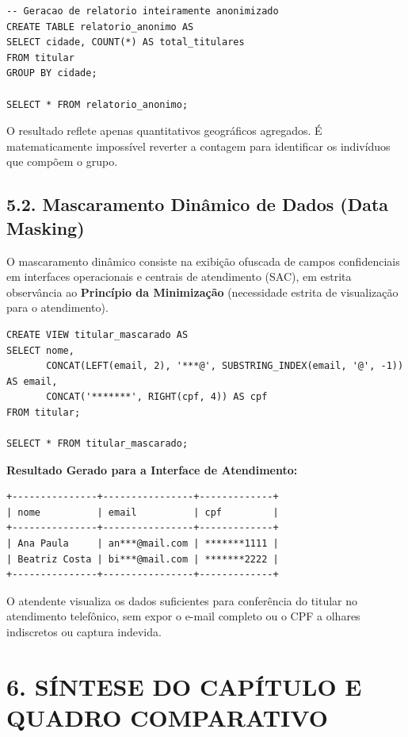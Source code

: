 \begin{lstlisting}
-- Geracao de relatorio inteiramente anonimizado
CREATE TABLE relatorio_anonimo AS
SELECT cidade, COUNT(*) AS total_titulares
FROM titular
GROUP BY cidade;

SELECT * FROM relatorio_anonimo;
\end{lstlisting}
O resultado reflete apenas quantitativos geográficos agregados. É matematicamente impossível reverter a contagem para identificar os indivíduos que compõem o grupo.

\subsection*{5.2. Mascaramento Dinâmico de Dados (Data Masking)}

O mascaramento dinâmico consiste na exibição ofuscada de campos confidenciais em interfaces operacionais e centrais de atendimento (SAC), em estrita observância ao \textbf{Princípio da Minimização} (necessidade estrita de visualização para o atendimento).

\begin{lstlisting}
CREATE VIEW titular_mascarado AS
SELECT nome,
       CONCAT(LEFT(email, 2), '***@', SUBSTRING_INDEX(email, '@', -1)) AS email,
       CONCAT('*******', RIGHT(cpf, 4)) AS cpf
FROM titular;

SELECT * FROM titular_mascarado;
\end{lstlisting}

\textbf{Resultado Gerado para a Interface de Atendimento:}
\begin{lstlisting}
+---------------+----------------+-------------+
| nome          | email          | cpf         |
+---------------+----------------+-------------+
| Ana Paula     | an***@mail.com | *******1111 |
| Beatriz Costa | bi***@mail.com | *******2222 |
+---------------+----------------+-------------+
\end{lstlisting}

O atendente visualiza os dados suficientes para conferência do titular no atendimento telefônico, sem expor o e-mail completo ou o CPF a olhares indiscretos ou captura indevida.

\newpage

\section*{6. SÍNTESE DO CAPÍTULO E QUADRO COMPARATIVO}

